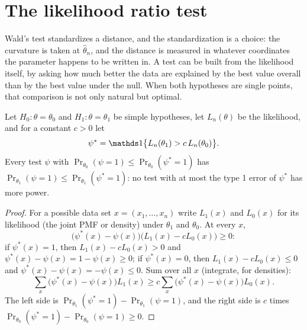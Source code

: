 \section{The likelihood ratio test}
\label{sec:wlr-lrt}

Wald's test standardizes a distance, and the standardization is a choice: the curvature is taken at $\hat{\theta}_n$, and the distance is measured in whatever coordinates the parameter happens to be written in.
A test can be built from the likelihood itself, by asking how much better the data are explained by the best value overall than by the best value under the null.
When both hypotheses are single points, that comparison is not only natural but optimal.

\begin{proposition}
\label{prop:neyman-pearson}
Let $H_0: \theta = \theta_0$ and $H_1: \theta = \theta_1$ be simple hypotheses, let $L_n(\theta)$ be the likelihood, and for a constant $c > 0$ let
\[
\psi^* = \ind\big\{L_n(\theta_1) > c\,L_n(\theta_0)\big\}.
\]
Every test $\psi$ with $\Pr_{\theta_0}(\psi = 1) \leq \Pr_{\theta_0}(\psi^* = 1)$ has $\Pr_{\theta_1}(\psi = 1) \leq \Pr_{\theta_1}(\psi^* = 1)$: no test with at most the type 1 error of $\psi^*$ has more power.
\end{proposition}

\begin{proof}
For a possible data set $x = (x_1, \ldots, x_n)$ write $L_1(x)$ and $L_0(x)$ for its likelihood (the joint PMF or density) under $\theta_1$ and $\theta_0$.
At every $x$,
\[
\big(\psi^*(x) - \psi(x)\big)\big(L_1(x) - cL_0(x)\big) \geq 0:
\]
if $\psi^*(x) = 1$, then $L_1(x) - cL_0(x) > 0$ and $\psi^*(x) - \psi(x) = 1 - \psi(x) \geq 0$; if $\psi^*(x) = 0$, then $L_1(x) - cL_0(x) \leq 0$ and $\psi^*(x) - \psi(x) = -\psi(x) \leq 0$.
Sum over all $x$ (integrate, for densities):
\[
\sum_x \big(\psi^*(x) - \psi(x)\big)L_1(x) \geq c\sum_x\big(\psi^*(x) - \psi(x)\big)L_0(x).
\]
The left side is $\Pr_{\theta_1}(\psi^* = 1) - \Pr_{\theta_1}(\psi = 1)$, and the right side is $c$ times $\Pr_{\theta_0}(\psi^* = 1) - \Pr_{\theta_0}(\psi = 1) \geq 0$.
\end{proof}

